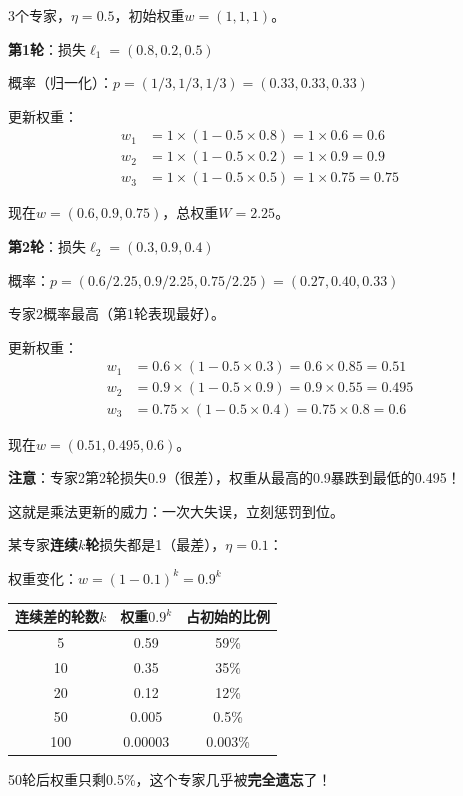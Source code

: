 \documentclass[11pt,a4paper]{article}
\theoremstyle{definition}
\begin{document}
\begin{calculation}[MWU完整手算]
3个专家，$\eta = 0.5$，初始权重$w = (1, 1, 1)$。

\textbf{第1轮}：损失$\ell_1 = (0.8, 0.2, 0.5)$

概率（归一化）：$p = (1/3, 1/3, 1/3) = (0.33, 0.33, 0.33)$

更新权重：
\begin{align*}
w_1 &= 1 \times (1 - 0.5 \times 0.8) = 1 \times 0.6 = 0.6 \\
w_2 &= 1 \times (1 - 0.5 \times 0.2) = 1 \times 0.9 = 0.9 \\
w_3 &= 1 \times (1 - 0.5 \times 0.5) = 1 \times 0.75 = 0.75
\end{align*}

现在$w = (0.6, 0.9, 0.75)$，总权重$W = 2.25$。

\textbf{第2轮}：损失$\ell_2 = (0.3, 0.9, 0.4)$

概率：$p = (0.6/2.25, 0.9/2.25, 0.75/2.25) = (0.27, 0.40, 0.33)$

专家2概率最高（第1轮表现最好）。

更新权重：
\begin{align*}
w_1 &= 0.6 \times (1 - 0.5 \times 0.3) = 0.6 \times 0.85 = 0.51 \\
w_2 &= 0.9 \times (1 - 0.5 \times 0.9) = 0.9 \times 0.55 = 0.495 \\
w_3 &= 0.75 \times (1 - 0.5 \times 0.4) = 0.75 \times 0.8 = 0.6
\end{align*}

现在$w = (0.51, 0.495, 0.6)$。

\textbf{注意}：专家2第2轮损失0.9（很差），权重从最高的0.9暴跌到最低的0.495！

这就是乘法更新的威力：一次大失误，立刻惩罚到位。
\end{calculation}

\begin{calculation}[指数惩罚有多狠]
某专家\textbf{连续$k$轮}损失都是1（最差），$\eta = 0.1$：

权重变化：$w = (1-0.1)^k = 0.9^k$

\begin{center}
\begin{tabular}{c|c|c}
\toprule
连续差的轮数$k$ & 权重$0.9^k$ & 占初始的比例 \\
\midrule
5 & 0.59 & 59\% \\
10 & 0.35 & 35\% \\
20 & 0.12 & 12\% \\
50 & 0.005 & 0.5\% \\
100 & 0.00003 & 0.003\% \\
\bottomrule
\end{tabular}
\end{center}

50轮后权重只剩0.5\%，这个专家几乎被\textbf{完全遗忘}了！
\end{calculation}
\end{document}
